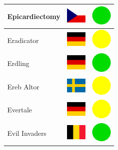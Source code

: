 \documentclass[12pt, a4paper, twoside]{report}
\begin{document}
\begin{center}
\begin{longtable}{|p{5cm}|p{2cm}|p{2cm}|}
			Epicardiectomy & \includegraphics[width=1cm]{4x3/cz} & \includegraphics[width=1cm]{likes/y} \\ \hline
			Eradicator & \includegraphics[width=1cm]{4x3/de} & \includegraphics[width=1cm]{likes/m} \\ \hline
			Erdling & \includegraphics[width=1cm]{4x3/de} & \includegraphics[width=1cm]{likes/y} \\ \hline
			Ereb Altor & \includegraphics[width=1cm]{4x3/se} & \includegraphics[width=1cm]{likes/m} \\ \hline
			Evertale & \includegraphics[width=1cm]{4x3/de} & \includegraphics[width=1cm]{likes/m} \\ \hline
			Evil Invaders & \includegraphics[width=1cm]{4x3/be} & \includegraphics[width=1cm]{likes/y} \\ \hline

\end{longtable}
\end{center}
\end{document}
